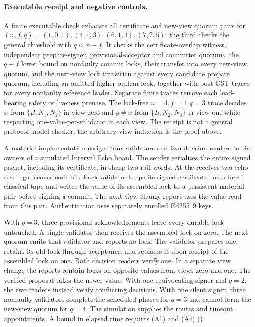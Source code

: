 \paragraph{Executable receipt and negative controls.}
A finite executable check exhausts all certificate and new-view quorum pairs
for \((n,f,q)=(1,0,1),(4,1,3),(6,1,4),(7,2,5)\); the third checks the
general threshold with \(q<n-f\). It checks the certificate-overlap witness,
independent prepare-signer, provisional-acceptor and committer quorums, the
\(q-f\) lower bound on nonfaulty commit locks, their transfer into every
new-view quorum, and the next-view lock transition against every candidate
prepare quorum, including an omitted higher orphan lock, together with
post-GST traces for every nonfaulty reference leader. Separate finite traces
remove each load-bearing safety or liveness premise. The lock-free
\(n=4,f=1,q=3\) trace decides \(x\) from \(\{B,N_1,N_2\}\) in view zero and
\(y\ne x\) from \(\{B,N_2,N_3\}\) in view one while respecting
one-value-per-validator in each view. The receipt is not a general
protocol-model checker; the arbitrary-view induction is the proof above.

A material implementation assigns four validators and two decision readers
to six owners of a simulated Interval Echo board. The sender serializes the
entire signed packet, including its certificate, in sharp two-rail words.
At the receiver two echo readings recover each bit. Each validator keeps
its signed certificates on a local classical tape and writes the value of
its assembled lock to a persistent material pair before signing a commit.
The next view-change report uses the value read from this pair.
Authentication uses separately enrolled Ed25519 keys.

With $q=3$, three provisional acknowledgements leave every durable lock
untouched. A single validator then receives the assembled lock on zero.
The next quorum omits that validator and reports no lock. The validator
prepares one, retains its old lock through acceptance, and replaces it
upon receipt of the assembled lock on one. Both decision readers verify
one. In a separate view change the reports contain locks on opposite
values from views zero and one. The verified proposal takes the newer
value. With one equivocating signer and $q=2$, the two readers instead
verify conflicting decisions. With one silent signer, three nonfaulty
validators complete the scheduled phases for $q=3$ and cannot form the
new-view quorum for $q=4$. The simulation supplies the routes and timeout
appointments. A bound in elapsed time requires (A1) and (A4)
().

